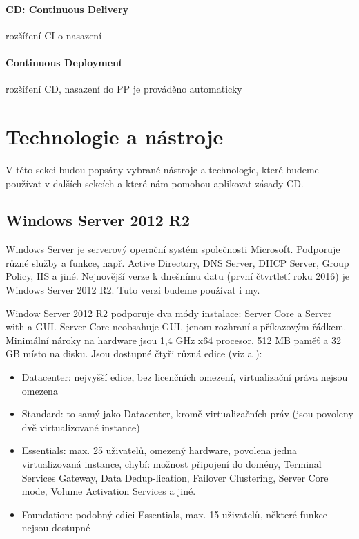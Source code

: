 \paragraph{CD: Continuous Delivery} rozšíření CI o nasazení
\paragraph{Continuous Deployment} rozšíření CD, nasazení do PP je prováděno automaticky

\section{Technologie a nástroje}
V této sekci budou popsány vybrané nástroje a technologie, které budeme používat v dalších sekcích a které nám pomohou aplikovat zásady CD.

\subsection{Windows Server 2012 R2}
Windows Server je serverový operační systém společnosti Microsoft. Podporuje různé služby a funkce, např. Active Directory, DNS Server, DHCP Server, Group Policy, IIS a jiné. Nejnovější verze k dnešnímu datu (první čtvrtletí roku 2016) je Windows Server 2012 R2. Tuto verzi budeme používat i my. \cite{MasteringWindowsServer}

Window Server 2012 R2 podporuje dva módy instalace: Server Core a Server with a GUI. Server Core neobsahuje GUI, jenom rozhraní s příkazovým řádkem. Minimální nároky na hardware jsou 1,4 GHz x64 procesor, 512 MB paměť a 32 GB místo na disku. Jsou dostupné čtyři různá edice (viz \cite{WindowsServer2012Editions} a \cite{WindowsServer2012Licensing}):

\begin{itemize}
\item Datacenter: nejvyšší edice, bez licenčních omezení, virtualizační práva nejsou omezena
\item Standard: to samý jako Datacenter, kromě virtualizačních práv (jsou povoleny dvě virtualizované instance)
\item Essentials: max. 25 uživatelů, omezený hardware, povolena jedna virtualizovaná instance, chybí: možnost připojení do domény, Terminal Services Gateway, Data Dedup-lication, Failover Clustering, Server Core mode, Volume Activation Services a jiné.
\item Foundation: podobný edici Essentials, max. 15 uživatelů, některé funkce nejsou dostupné
\end{itemize}

